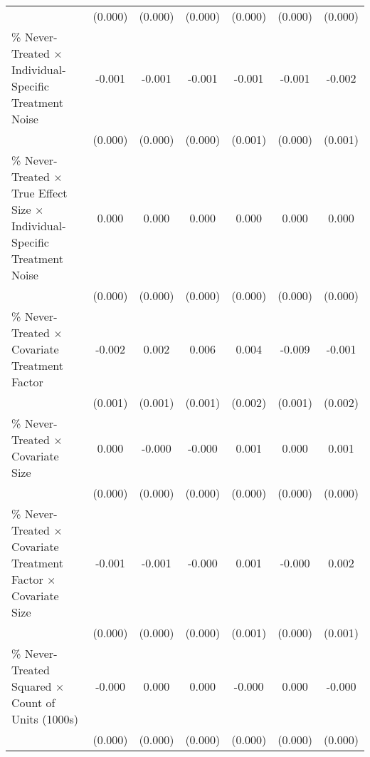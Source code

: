 \begin{table}[htbp]
\begin{tabular}{l*{6}{c}}
                    &     (0.000)         &     (0.000)         &     (0.000)         &     (0.000)         &     (0.000)         &     (0.000)         \\
\% Never-Treated $\times$ Individual-Specific Treatment Noise&      -0.001\sym{*}  &      -0.001\sym{*}  &      -0.001\sym{**} &      -0.001         &      -0.001\sym{**} &      -0.002         \\
                    &     (0.000)         &     (0.000)         &     (0.000)         &     (0.001)         &     (0.000)         &     (0.001)         \\
\% Never-Treated $\times$ True Effect Size $\times$ Individual-Specific Treatment Noise&       0.000         &       0.000\sym{**} &       0.000         &       0.000         &       0.000         &       0.000         \\
                    &     (0.000)         &     (0.000)         &     (0.000)         &     (0.000)         &     (0.000)         &     (0.000)         \\
\% Never-Treated $\times$ Covariate Treatment Factor&      -0.002\sym{***}&       0.002\sym{**} &       0.006\sym{***}&       0.004         &      -0.009\sym{***}&      -0.001         \\
                    &     (0.001)         &     (0.001)         &     (0.001)         &     (0.002)         &     (0.001)         &     (0.002)         \\
\% Never-Treated $\times$ Covariate Size&       0.000         &      -0.000         &      -0.000         &       0.001\sym{*}  &       0.000         &       0.001\sym{*}  \\
                    &     (0.000)         &     (0.000)         &     (0.000)         &     (0.000)         &     (0.000)         &     (0.000)         \\
\% Never-Treated $\times$ Covariate Treatment Factor $\times$ Covariate Size&      -0.001\sym{***}&      -0.001\sym{**} &      -0.000         &       0.001\sym{*}  &      -0.000         &       0.002\sym{***}\\
                    &     (0.000)         &     (0.000)         &     (0.000)         &     (0.001)         &     (0.000)         &     (0.001)         \\
\% Never-Treated Squared $\times$ Count of Units (1000s)&      -0.000         &       0.000         &       0.000         &      -0.000         &       0.000         &      -0.000         \\
                    &     (0.000)         &     (0.000)         &     (0.000)         &     (0.000)         &     (0.000)         &     (0.000)         \\

\end{tabular}
\end{table}
